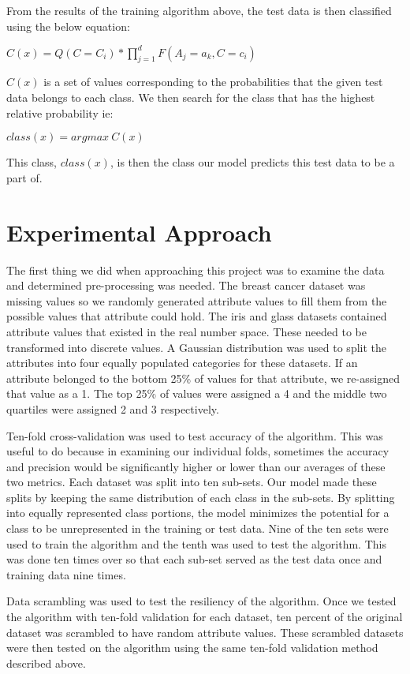 \documentclass[twoside,11pt]{article}
\begin{document}
From the results of the training algorithm above, the test data is then classified using the below equation:
\begin{center}
    $C(x) = Q(C=C_i) * \prod_{j=1}^d F(A_j = a_k, C = c_i)$
\end{center}
$C(x)$ is a set of values corresponding to the probabilities that the given test data belongs to each class. We then search for the class that has the highest relative probability ie:
\begin{center}
    $class(x) = argmax\ C(x)$
\end{center}
This class, $class(x)$, is then the class our model predicts this test data to be a part of.\citep{she19}

\section{Experimental Approach}

The first thing we did when approaching this project was to examine the data and determined pre-processing was needed. The breast cancer dataset was missing values so we randomly generated attribute values to fill them from the possible values that attribute could hold. The iris and glass datasets contained attribute values that existed in the real number space. These needed to be transformed into discrete values. A Gaussian distribution was used to split the attributes into four equally populated categories for these datasets. If an attribute belonged to the bottom 25\% of values for that attribute, we re-assigned that value as a 1. The top 25\% of values were assigned a 4 and the middle two quartiles were assigned 2 and 3 respectively.

Ten-fold cross-validation was used to test accuracy of the algorithm.  This was useful to do because in examining our individual folds, sometimes the accuracy and precision would be significantly higher or lower than our averages of these two metrics. Each dataset was split into ten sub-sets. Our model made these splits by keeping the same distribution of each class in the sub-sets. By splitting into equally represented class portions, the model minimizes the potential for a class to be unrepresented in the training or test data. Nine of the ten sets were used to train the algorithm and the tenth was used to test the algorithm. This was done ten times over so that each sub-set served as the test data once and training data nine times. 

Data scrambling was used to test the resiliency of the algorithm. Once we tested the algorithm with ten-fold validation for each dataset, ten percent of the original dataset was scrambled to have random attribute values. These scrambled datasets were then tested on the algorithm using the same ten-fold validation method described above.   
\end{document}
